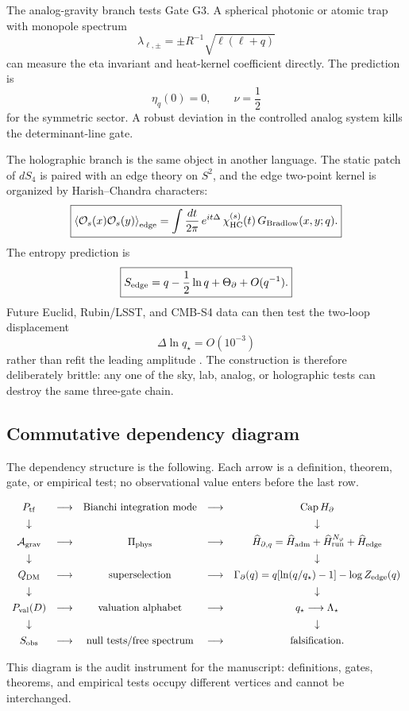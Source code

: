 \documentclass[aps,prd,reprint,nofootinbib,superscriptaddress,floatfix]{revtex4-2}
\numberwithin{equation}{section}
\theoremstyle{definition}
\theoremstyle{plain}
\begin{document}
The analog-gravity branch tests Gate G3.  A spherical photonic or atomic trap
with monopole spectrum
\[
\boxed{
\lambda_{\ell,\pm}
=
\pm R^{-1}\sqrt{\ell(\ell+q)}
}
\]
can measure the eta invariant and heat-kernel coefficient directly.  The
prediction is
\[
\boxed{
\eta_q(0)=0,\qquad \nu=\frac12
}
\]
for the symmetric sector.  A robust deviation in the controlled analog system
kills the determinant-line gate.

The holographic branch is the same object in another language.  The static
patch of \(dS_4\) is paired with an edge theory on \(S^2\), and the edge
two-point kernel is organized by Harish--Chandra characters:
\[
\boxed{
\left\langle
\mathcal O_s(x)\mathcal O_s(y)
\right\rangle_{\rm edge}
=
\int\frac{dt}{2\pi}\,
e^{it\Delta}\,
\chi_{\rm HC}^{(s)}(t)\,
G_{\rm Bradlow}(x,y;q).
}
\]
The entropy prediction is
\[
\boxed{
S_{\rm edge}
=
q-\frac12\ln q+\Theta_\partial+O(q^{-1}).
}
\]
Future Euclid, Rubin/LSST, and CMB-S4 data can then test the two-loop
displacement
\[
\boxed{
\Delta\ln q_\star=O(10^{-3})
}
\]
rather than refit the leading amplitude \cite{EuclidQ12026,RubinLSST2026,CMBS4Plan2025}.  The construction is therefore deliberately brittle: any one of
the sky, lab, analog, or holographic tests can destroy the same three-gate
chain.

\subsection{Commutative dependency diagram}

The dependency structure is the following.  Each arrow is a definition,
theorem, gate, or empirical test; no observational value enters before the
last row.

\begin{widetext}
\[
\begin{array}{ccccc}
P_{\rm tf}
&\longrightarrow&
{\rm Bianchi\ integration\ mode}
&\longrightarrow&
{\rm Cap}\,H_\partial
\\[4pt]
\downarrow &&&& \downarrow
\\[4pt]
\mathcal A_{\rm grav}
&\longrightarrow&
\Pi_{\rm phys}
&\longrightarrow&
\widehat H_{\partial,q}
=
\widehat H_{\rm adm}
+
\widehat H_{\rm run}^{N_\varphi}
+
\widehat H_{\rm edge}
\\[4pt]
\downarrow &&&& \downarrow
\\[4pt]
Q_{\rm DM}
&\longrightarrow&
{\rm superselection}
&\longrightarrow&
\Gamma_\partial(q)
=
q[\ln(q/q_\star)-1]-\log Z_{\rm edge}(q)
\\[4pt]
\downarrow &&&& \downarrow
\\[4pt]
P_{\rm val}(D)
&\longrightarrow&
{\rm valuation\ alphabet}
&\longrightarrow&
q_\star\longrightarrow \Lambda_\star
\\[4pt]
\downarrow &&&& \downarrow
\\[4pt]
S_{\rm obs}
&\longrightarrow&
{\rm null\ tests/free\ spectrum}
&\longrightarrow&
{\rm falsification}.
\end{array}
\]
\end{widetext}
This diagram is the audit instrument for the manuscript: definitions, gates,
theorems, and empirical tests occupy different vertices and cannot be
interchanged.
\end{document}
